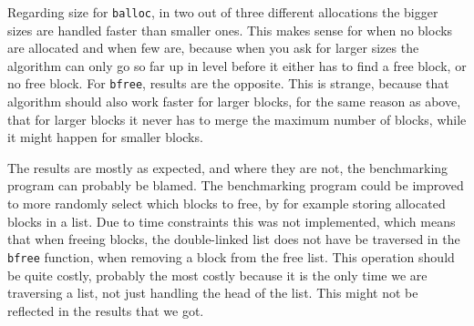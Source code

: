\documentclass{article}
\def\code#1{\texttt{#1}}
\begin{document}
Regarding size for \code{balloc}, in two out of three different allocations the bigger sizes are handled faster than smaller ones. This makes sense for when no blocks are allocated and when few are, because when you ask for larger sizes the algorithm can only go so far up in level before it either has to find a free block, or no free block. For \code{bfree}, results are the opposite. This is strange, because that algorithm should also work faster for larger blocks, for the same reason as above, that for larger blocks it never has to merge the maximum number of blocks, while it might happen for smaller blocks.

The results are mostly as expected, and where they are not, the benchmarking program can probably be blamed. The benchmarking program could be improved to more randomly select which blocks to free, by for example storing allocated blocks in a list. Due to time constraints this was not implemented, which means that when freeing blocks, the double-linked list does not have be traversed in the \code{bfree} function, when removing a block from the free list. This operation should be quite costly, probably the most costly because it is the only time we are traversing a list, not just handling the head of the list. This might not be reflected in the results that we got.
\end{document}
